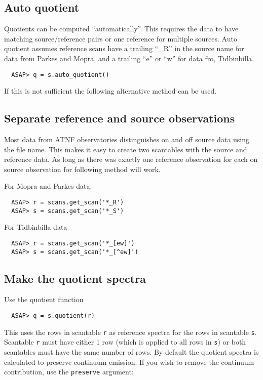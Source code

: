 \documentclass[11pt]{article}
\newcommand{\cmd}[1]{{\tt #1}}
\begin{document}
\subsection{Auto quotient}
Quotients can be computed ``automatically''. This requires the data to
have matching source/reference pairs or one reference for multiple
sources. Auto quotient assumes reference scans have a trailing ``\_R''
in the source name for data from Parkes and Mopra, and a trailing
``e'' or ``w'' for data fro, Tidbinbilla.

\begin{verbatim}
  ASAP> q = s.auto_quotient()
\end{verbatim}

If this is not sufficient the following alternative method can be used.

\subsection{Separate reference and source observations}

Most data from ATNF observatories distinguishes on and off source data
using the file name. This makes it easy to create two scantables with
the source and reference data. As long as there was exactly one
reference observation for each on source observation for following
method will work.

For Mopra and Parkes data:
\begin{verbatim}
  ASAP> r = scans.get_scan('*_R')
  ASAP> s = scans.get_scan('*_S')
\end{verbatim}

For Tidbinbilla data
\begin{verbatim}
  ASAP> r = scans.get_scan('*_[ew]')
  ASAP> s = scans.get_scan('*_[^ew]')
\end{verbatim}

\subsection{Make the quotient spectra}

Use the quotient function

\begin{verbatim}
  ASAP> q = s.quotient(r)
\end{verbatim}

This uses the rows in scantable \cmd{r} as reference spectra for the
rows in scantable \cmd{s}. Scantable \cmd{r} must have either 1 row
(which is applied to all rows in \cmd{s}) or both scantables must have
the same number of rows. By default the quotient spectra is calculated
to preserve continuum emission. If you wish to remove the continuum
contribution, use the \cmd{preserve} argument:
\end{document}

